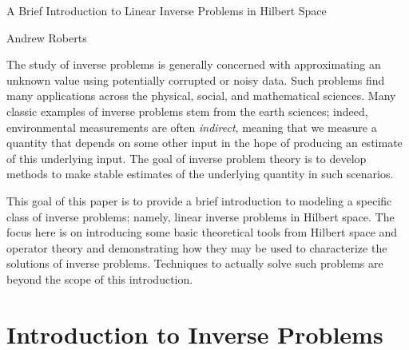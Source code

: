 \documentclass[12pt]{article}
\begin{document}
\begin{center}
\Large
A Brief Introduction to Linear Inverse Problems in Hilbert Space
\end{center}

\begin{flushright}
Andrew Roberts
\end{flushright} 

The study of inverse problems is generally concerned with approximating 
an unknown value using potentially corrupted or noisy data. Such problems find
many applications across the physical, social, and mathematical sciences. Many 
classic examples of inverse problems stem from the earth sciences; indeed,
environmental measurements are often \textit{indirect}, meaning that we measure a quantity
that depends on some other input in the hope of producing an estimate of this 
underlying input. The goal of inverse problem theory is to develop methods to make stable
estimates of the underlying quantity in such scenarios. 

This goal of this paper is to provide a brief introduction to modeling a specific class of inverse
problems; namely, linear inverse problems in Hilbert space.
The focus here is on introducing some basic theoretical tools from Hilbert space and 
operator theory and demonstrating how they may be used to characterize the 
solutions of inverse problems. Techniques to actually solve such problems are beyond the
scope of this introduction. 

\section{Introduction to Inverse Problems} \label{inverse_problem_intro}
\end{document}
